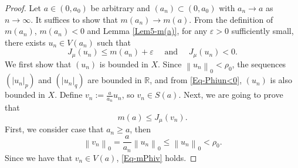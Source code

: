 \documentclass[10pt,a4paper]{amsart}
\begin{document}
    \begin{proof}
        Let $a \in\left(0, a_0\right)$ be arbitrary and $\left(a_n\right) \subset\left(0, a_0\right)$ with $a_n \rightarrow a$ as $n\rightarrow\infty$.
        It suffices to show that
        $m\left(a_n\right) \rightarrow m(a)$.
        {From the definition of $m\left(a_n\right)$, $m\left(a_n\right)<0$ and Lemma \ref{Lem5-m(a)},} for any $\varepsilon>0$ sufficiently small, there exists $u_n \in V\left(a_n\right)$ such that
        \begin{equation}\label{Eq-Phiun<0}
            J_\mu\left(u_n\right) \leq m\left(a_n\right)+\varepsilon \quad \text { and } \quad J_\mu\left(u_n\right)<0.
        \end{equation}
        {We first show that $(u_n)$ is bounded in $X$. Since $\left\| u_n\right\|_{0}<\rho_0$, the sequences {$(\left|u_n\right|_p)$ and $(\left|u_n\right|_{q})$  are bounded  in $\mathbb{R}$,} and from \eqref{Eq-Phiun<0},  $(u_n)$ is also bounded in $X$. Define $v_n:={\frac{a}{a_n}} u_n$, so $v_n \in {S}(a)$. Next, we are going to prove that}
        \begin{equation}\label{Eq-mPhiv}
            m(a) \leq J_\mu\left(v_n\right).
        \end{equation}
        First, we consider case that $a_n \geq a$, then
        \begin{equation}
            \left\| v_n\right\|_{0}=\frac{a}{a_n}\left\| u_n\right\|_{0} \leq\left\| u_n\right\|_{0}<\rho_0.
        \end{equation}
        Since we have that $v_n \in V(a)$, \eqref{Eq-mPhiv} holds.



\end{proof}
\end{document}
